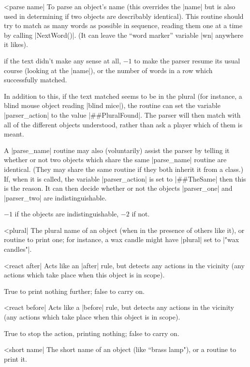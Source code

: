 ^^|parse name|
\fo To parse an object's name (this overrides the |name| but is also used in
determining if two objects are describably identical). This routine should
try to match as many words as possible in sequence, reading them one at a
time by calling |NextWord()|. (It can leave the ``word marker'' variable
|wn| anywhere it likes).

 if the text didn't make any sense at all, $-1$ to make the parser resume
its usual course (looking at the |name|), or the number of words in a row
which successfully matched.

\noindent In addition to this, if the text matched seems to be in the plural
(for instance, a blind mouse object reading |blind mice|), the routine can
set the variable |parser_action| to the value |##PluralFound|.  The parser
will then match with all of the different objects understood, rather than
ask a player which of them is meant.

\noindent A |parse_name| routine may also (voluntarily) assist the parser
by telling it whether or not two objects which share the same |parse_name|
routine are identical.  (They may share the same routine if they both inherit
it from a class.)  If, when it is called, the variable |parser_action| is
set to |##TheSame| then this is the reason.  It can then decide whether or
not the objects |parser_one| and |parser_two| are indistinguishable.

\rr $-1$ if the objects are indistinguishable, $-2$ if not.

^^|plural|
\fo The plural name of an object (when in the presence of others like it),
or routine to print one; for instance, a wax candle might have |plural| set
to |"wax candles"|.

\nrr

^^|react after|
\fo Acts like an |after| rule, but detects any actions in the vicinity
(any actions which take place when this object is in scope).

\rr True to print nothing further; false to carry on.

^^|react before|
\fo Acts like a |before| rule, but detects any actions in the vicinity
(any actions which take place when this object is in scope).

\rr True to stop the action, printing nothing; false to carry on.

^^|short name|
\fo The short name of an object (like ``brass lamp"), or a routine to print
it.

